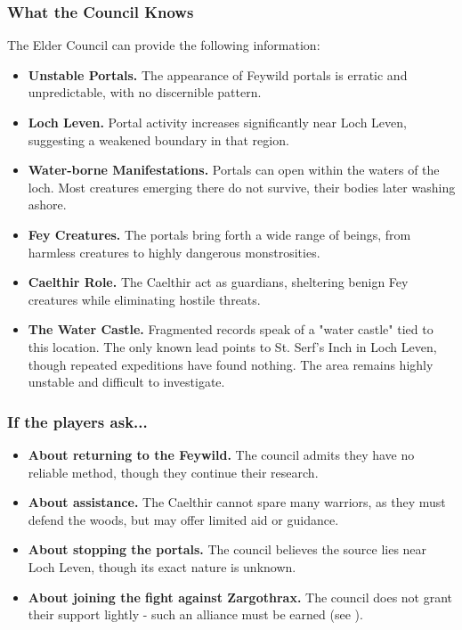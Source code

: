 \subsubsection*{What the Council Knows}
{\entryfont The Elder Council can provide the following information:
\begin{itemize}\renewcommand\labelitemi{\textbf{\textbullet}}
	\item \textbf{Unstable Portals.} The appearance of Feywild portals is erratic and unpredictable, with no discernible pattern.
	\item \textbf{Loch Leven.} Portal activity increases significantly near Loch Leven, suggesting a weakened boundary in that region.
	\item \textbf{Water-borne Manifestations.} Portals can open within the waters of the loch. Most creatures emerging there do not survive, their bodies later washing ashore.
	\item \textbf{Fey Creatures.} The portals bring forth a wide range of beings, from harmless creatures to highly dangerous monstrosities.
	\item \textbf{Caelthir Role.} The Caelthir act as guardians, sheltering benign Fey creatures while eliminating hostile threats.
	\item \textbf{The Water Castle.} Fragmented records speak of a "water castle" tied to this location. The only known lead points to St. Serf's Inch in Loch Leven, though repeated expeditions have found nothing. The area remains highly unstable and difficult to investigate.
\end{itemize}}
\subsubsection*{If the players ask...}
{\entryfont\begin{itemize}\renewcommand\labelitemi{\textbf{\textbullet}}
	\item \textbf{About returning to the Feywild.} The council admits they have no reliable method, though they continue their research.
	\item \textbf{About assistance.} The Caelthir cannot spare many warriors, as they must defend the woods, but may offer limited aid or guidance.
	\item \textbf{About stopping the portals.} The council believes the source lies near Loch Leven, though its exact nature is unknown.
	\item \textbf{About joining the fight against Zargothrax.} The council does not grant their support lightly - such an alliance must be earned (see \hyperref[alliance:CaelthirElves]{}).
\end{itemize}}
\vfill\eject
